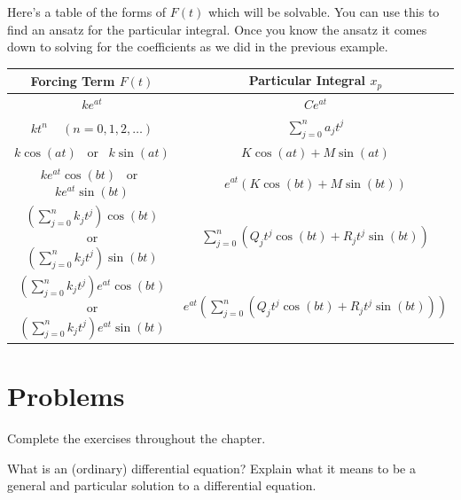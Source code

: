         \noindent Here's a table of the forms of $F(t)$ which will be solvable. You can use this to find an ansatz for the particular integral.  Once you know the ansatz it comes down to solving for the coefficients as we did in the previous example.
        \begin{table}[H]
        \centering
        \renewcommand{\arraystretch}{1.75}
            \begin{tabular}{c|c}
                Forcing Term $F(t)$&  Particular Integral $x_p$\\
                \hline
                $ke^{at}$ & $Ce^{at}$\\
                \hline
                $kt^n$ ~ $(n=0,1,2,\dots)$ & $\sum_{j=0}^n a_j t^j$\\
                \hline
                $k\cos(at)$ ~\textrm{or}~ $k\sin(at)$ & $K\cos(at)+M\sin(at)$\\
                \hline
                $ke^{at}\cos(bt)$ ~\textrm{or}~ $ke^{at}\sin(bt)$ & $e^{at}(K\cos(bt)+M\sin(bt))$\\
                \hline
                $\displaystyle{\left(\sum_{j=0}^n k_jt^j\right) \cos(bt)}$ ~\textrm{or}~ $\displaystyle{\left(\sum_{j=0}^n k_jt^j\right) \sin(bt)}$ & $\displaystyle{\sum_{j=0}^n\left( Q_jt^j \cos(bt) + R_jt^j \sin(bt)\right)}$\\
                \hline
                $\displaystyle{\left(\sum_{j=0}^n k_jt^j\right) e^{at}\cos(bt)}$ ~\textrm{or}~ $\displaystyle{\left(\sum_{j=0}^n k_jt^j\right) e^{at}\sin(bt)}$ & $\displaystyle{e^{at}\left(\sum_{j=0}^n \left( Q_jt^j \cos(bt) + R_jt^j \sin(bt)\right)\right)}$
            \end{tabular}
    \end{table}



        \newpage
        \section*{Problems}
            \begin{problem}
        Complete the exercises throughout the chapter.
        \end{problem}

\begin{problem}
    What is an (ordinary) differential equation? Explain what it means to be a general and particular solution to a differential equation.
\end{problem}

